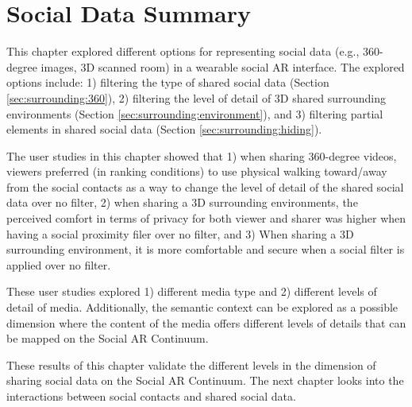 \pagebreak
\section{Social Data Summary}

This chapter explored different options for representing social data (e.g., 360-degree images, 3D scanned room) in a wearable social AR interface. The explored options include: 1) filtering the type of shared social data (Section \ref{sec:surrounding:360}), 2) filtering the level of detail of 3D shared surrounding environments (Section \ref{sec:surrounding:environment}), and 3) filtering partial elements in shared social data (Section \ref{sec:surrounding:hiding}). 

The user studies in this chapter showed that 1) when sharing 360-degree videos, viewers preferred (in ranking conditions) to use physical walking toward/away from the social contacts as a way to change the level of detail of the shared social data over no filter, 2) when sharing a 3D surrounding environments, the perceived comfort in terms of privacy for both viewer and sharer was higher when having a social proximity filer over no filter, and 3)  When sharing a 3D surrounding environment, it is more comfortable and secure when a social filter is applied over no filter.

These user studies explored 1) different media type and 2) different levels of detail of media. Additionally, the semantic context can be explored as a possible dimension where the content of the media offers different levels of details that can be mapped on the Social AR Continuum. 

These results of this chapter validate the different levels in the dimension of sharing social data on the Social AR Continuum. The next chapter looks into the interactions between social contacts and shared social data. 